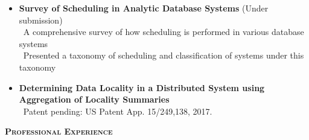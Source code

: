 \documentclass[11pt]{article}
\newcommand{\graybox}[1]{\begin{mdframed}[backgroundcolor=light-gray, linecolor=light-gray, roundcorner=10pt, shadow=false, shadowsize=1pt]
\Large{\textbf{\textsc{#1}}}
\end{mdframed}}
\begin{document}
\begin{itemize}
\item{\textbf{Survey of Scheduling in Analytic Database Systems} (Under submission)}	\\
		\textendash\ A comprehensive survey of how scheduling is performed in various database systems\\
		\textendash\ Presented a taxonomy of scheduling and classification of systems under this taxonomy\\ 

\item{\textbf{Determining Data Locality in a Distributed System using Aggregation of Locality Summaries}}\\
    \textendash\ Patent pending: US Patent App. 15/249,138, 2017.\\
\end{itemize}
\graybox{Professional Experience}
\end{document}
